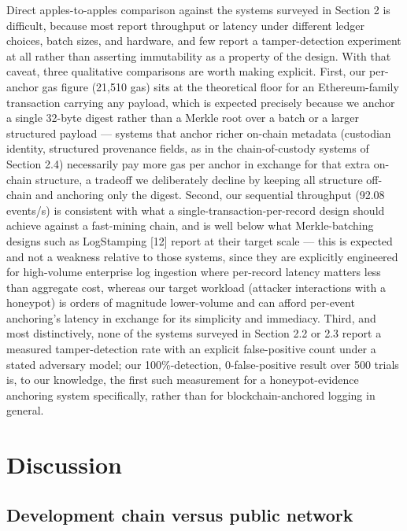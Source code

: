 \documentclass[journal]{IEEEtran}
\begin{document}
Direct apples-to-apples comparison against the systems surveyed in Section 2 is difficult, because most report throughput or latency under different ledger choices, batch sizes, and hardware, and few report a tamper-detection experiment at all rather than asserting immutability as a property of the design. With that caveat, three qualitative comparisons are worth making explicit. First, our per-anchor gas figure (21,510 gas) sits at the theoretical floor for an Ethereum-family transaction carrying any payload, which is expected precisely because we anchor a single 32-byte digest rather than a Merkle root over a batch or a larger structured payload --- systems that anchor richer on-chain metadata (custodian identity, structured provenance fields, as in the chain-of-custody systems of Section 2.4) necessarily pay more gas per anchor in exchange for that extra on-chain structure, a tradeoff we deliberately decline by keeping all structure off-chain and anchoring only the digest. Second, our sequential throughput (92.08 events/s) is consistent with what a single-transaction-per-record design should achieve against a fast-mining chain, and is well below what Merkle-batching designs such as LogStamping [12] report at their target scale --- this is expected and not a weakness relative to those systems, since they are explicitly engineered for high-volume enterprise log ingestion where per-record latency matters less than aggregate cost, whereas our target workload (attacker interactions with a honeypot) is orders of magnitude lower-volume and can afford per-event anchoring's latency in exchange for its simplicity and immediacy. Third, and most distinctively, none of the systems surveyed in Section 2.2 or 2.3 report a measured tamper-detection rate with an explicit false-positive count under a stated adversary model; our 100\%-detection, 0-false-positive result over 500 trials is, to our knowledge, the first such measurement for a honeypot-evidence anchoring system specifically, rather than for blockchain-anchored logging in general.

\section{Discussion}

\subsection{Development chain versus public network}
\end{document}
